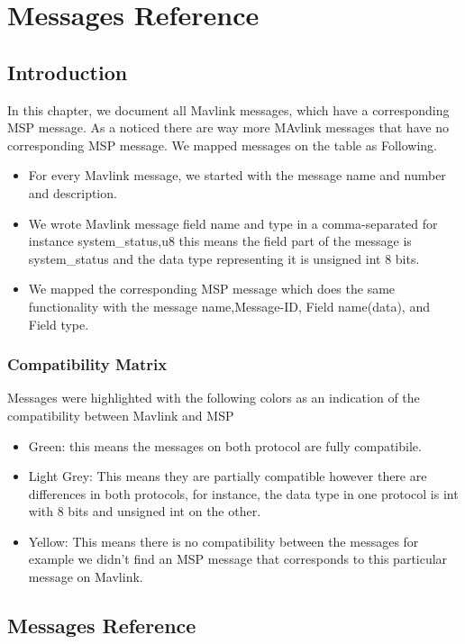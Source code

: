 \chapter{Messages Reference}
\section{Introduction} 
In this chapter, we document all Mavlink messages, which have a corresponding MSP message.
As a noticed there are way more MAvlink messages that have no corresponding MSP message.
We mapped messages on the table as Following.
\begin{itemize}
  \item For every Mavlink message, we started with the message name and number and description.
  \item We wrote Mavlink message field name and type in a comma-separated for instance system\_status,u8 this means the field part of the message is system\_status and the data type representing it is unsigned int 8 bits.
  \item  We mapped the corresponding MSP message which does the same functionality with the message name,Message-ID, Field name(data), and Field type.   
\end{itemize}


\subsection{Compatibility  Matrix \\} 
Messages were highlighted with the following colors as an indication of the compatibility between Mavlink and MSP
\begin{itemize}
  \item Green: this means the messages on both protocol are fully compatibile.    
  \item Light Grey: This means they are partially compatible however there are differences in both protocols, for instance, the data type in one protocol is int with 8 bits and unsigned int on the other.
  \item Yellow: This means there is no compatibility between the messages for example we didn't find an MSP message that corresponds to this particular message on Mavlink. 
\end{itemize}
\cleardoublepage

\section{Messages Reference}

